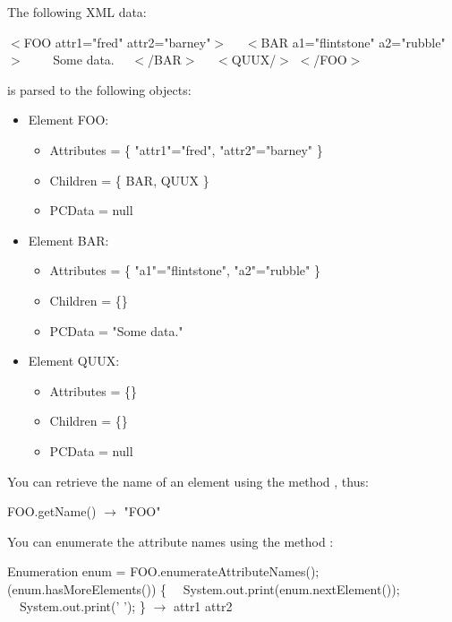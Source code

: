 The following XML data:

\begin{example}
$<$FOO attr1="fred" attr2="barney"$>$
~~$<$BAR a1="flintstone" a2="rubble"$>$
~~~~Some data.
~~$<$/BAR$>$
~~$<$QUUX/$>$
$<$/FOO$>$
\end{example}

is parsed to the following objects:

\begin{itemize}
  \item[] Element FOO:
    \begin{itemize}
      \item[] Attributes = \{ "attr1"="fred", "attr2"="barney" \}
      \item[] Children = \{ BAR, QUUX \}
      \item[] PCData = null
    \end{itemize}
  \item[] Element BAR:
    \begin{itemize}
      \item[] Attributes = \{ "a1"="flintstone", "a2"="rubble" \}
      \item[] Children = \{\}
      \item[] PCData = "Some data."
    \end{itemize}
  \item[] Element QUUX:
    \begin{itemize}
      \item[] Attributes = \{\}
      \item[] Children = \{\}
      \item[] PCData = null
    \end{itemize}
\end{itemize}

You can retrieve the name of an element using the method ,
thus:

\begin{example}
FOO.getName() $\to$ "FOO"
\end{example}

You can enumerate the attribute names using the method
:

\begin{example}
Enumeration enum = FOO.enumerateAttributeNames();
 (enum.hasMoreElements()) \{
~~System.out.print(enum.nextElement());
~~System.out.print(' ');
\}
$\to$ attr1 attr2
\end{example}

